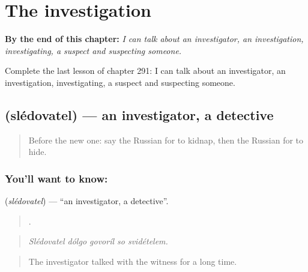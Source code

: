 
\chapter{The investigation}
\label{ch:ru-the-investigation}

\begin{chapteropening}
\textbf{By the end of this chapter:} \emph{I can talk about an investigator, an investigation, investigating, a suspect and suspecting someone.}

Complete the last lesson of chapter 291: I can talk about an investigator, an investigation, investigating, a suspect and suspecting someone.
\end{chapteropening}

\section[\texorpdfstring{\ru{следователь} (slédovatel)}{следователь (slédovatel)}]{ (slédovatel) — an investigator, a detective}

\label{lesson:RU-C291-sledovatel}



\begin{quote}
Before the new one: say the Russian for to kidnap, then the Russian for to hide.
\end{quote}

\subsection*{You'll want to know: }
\textbf{} (\emph{slédovatel}) — \textquotedblleft{}an investigator, a detective\textquotedblright{}.

\begin{quote}
    .
\end{quote}

\begin{quote}
\emph{Slédovatel dólgo govoríl so svidételem.}
\end{quote}

\begin{quote}
The investigator talked with the witness for a long time.
\end{quote}

